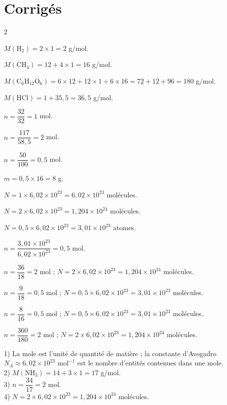 \section{Corrigés}
\begin{multicols}{2}

$M(\mathrm{H_2})=2\times1=2$ g/mol.

$M(\mathrm{CH_4})=12+4\times1=16$ g/mol.

$M(\mathrm{C_6H_{12}O_6})=6\times12+12\times1+6\times16=72+12+96=180$ g/mol.

$M(\mathrm{HCl})=1+35{,}5=36{,}5$ g/mol.

$n=\dfrac{32}{32}=1$ mol.

$n=\dfrac{117}{58{,}5}=2$ mol.

$n=\dfrac{50}{100}=0{,}5$ mol.

$m=0{,}5\times16=8$ g.

$N=1\times6{,}02\times10^{23}=6{,}02\times10^{23}$ molécules.

$N=2\times6{,}02\times10^{23}=1{,}204\times10^{24}$ molécules.

$N=0{,}5\times6{,}02\times10^{23}=3{,}01\times10^{23}$ atomes.

$n=\dfrac{3{,}01\times10^{23}}{6{,}02\times10^{23}}=0{,}5$ mol.

$n=\dfrac{36}{18}=2$ mol ; $N=2\times6{,}02\times10^{23}=1{,}204\times10^{24}$ molécules.

$n=\dfrac9{18}=0{,}5$ mol ; $N=0{,}5\times6{,}02\times10^{23}=3{,}01\times10^{23}$
molécules.

$n=\dfrac8{16}=0{,}5$ mol ; $N=0{,}5\times6{,}02\times10^{23}=3{,}01\times10^{23}$
molécules.

$n=\dfrac{360}{180}=2$ mol ; $N=2\times6{,}02\times10^{23}=1{,}204\times10^{24}$
molécules.

1) La mole est l'unité de quantité de matière ; la constante d'Avogadro
$N_A\approx6{,}02\times10^{23}\text{ mol}^{-1}$ est le nombre d'entités contenues dans une
mole.\\
2) $M(\mathrm{NH_3})=14+3\times1=17$ g/mol.\\
3) $n=\dfrac{34}{17}=2$ mol.\\
4) $N=2\times6{,}02\times10^{23}=1{,}204\times10^{24}$ molécules.


\end{multicols}
